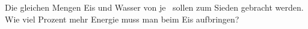 Die gleichen Mengen Eis und Wasser von je \TnO\ sollen zum Sieden gebracht werden. Wie viel Prozent mehr Energie muss man beim Eis aufbringen?
